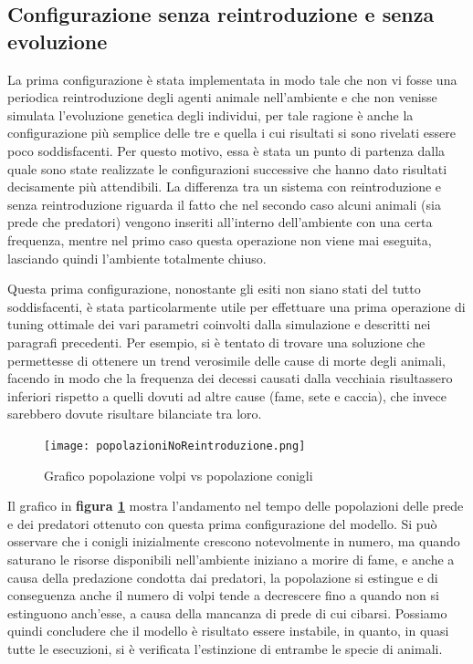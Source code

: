 \documentclass[11pt]{article}
\begin{document}
\subsection{Configurazione senza reintroduzione e senza evoluzione}
La prima configurazione è stata implementata in modo tale che non vi fosse una periodica reintroduzione degli agenti animale nell'ambiente e che non venisse simulata l'evoluzione genetica degli individui, per tale ragione è anche la configurazione più semplice delle tre e quella i cui risultati si sono rivelati essere poco soddisfacenti. Per questo motivo, essa è stata un punto di partenza dalla quale sono state realizzate le configurazioni successive che hanno dato risultati decisamente più attendibili. 
La differenza tra un sistema con reintroduzione e senza reintroduzione riguarda il fatto che nel secondo caso alcuni animali (sia prede che predatori) vengono inseriti all'interno dell'ambiente con una certa frequenza, mentre nel primo caso questa operazione non viene mai eseguita, lasciando quindi l'ambiente totalmente chiuso.

Questa prima configurazione, nonostante gli esiti non siano stati del tutto soddisfacenti, è stata particolarmente utile per effettuare una prima operazione di tuning ottimale dei vari  parametri coinvolti dalla simulazione e descritti nei paragrafi precedenti. Per esempio, si è tentato di trovare una soluzione che permettesse di ottenere un trend verosimile delle cause di morte degli animali, facendo in modo che la frequenza dei decessi causati dalla vecchiaia risultassero inferiori rispetto a quelli dovuti ad altre cause (fame, sete e caccia), che invece sarebbero dovute risultare bilanciate tra loro.   


\begin{figure}[h!]
     \centering
     \texttt{[image: popolazioniNoReintroduzione.png]}
     \caption{Grafico popolazione volpi vs popolazione conigli}
     \label{fig:coniglioVolpeNoReintroduzione}
\end{figure}

Il grafico in \textbf{figura \ref{fig:coniglioVolpeNoReintroduzione}} mostra l'andamento nel tempo delle popolazioni delle prede e dei predatori ottenuto con questa prima configurazione del modello. Si può osservare che i conigli inizialmente crescono notevolmente in numero, ma quando saturano le risorse disponibili nell'ambiente iniziano a morire di fame, e anche a causa della predazione condotta dai predatori, la popolazione si estingue e di conseguenza anche il numero di volpi tende a decrescere fino a quando non si estinguono anch'esse, a causa della mancanza di prede di cui cibarsi. Possiamo quindi concludere che il modello è risultato essere instabile, in quanto, in quasi tutte le esecuzioni, si è verificata l'estinzione di entrambe le specie di animali.
\end{document}
